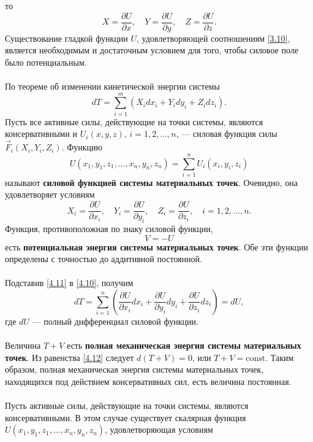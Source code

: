 \documentclass[a4paper, 12pt]{report}
\numberwithin{equation}{section}
\begin{document}
	то
	\begin{equation}
		\label{3.10}
		X = \frac{\partial U}{\partial x}, \quad Y = \frac{\partial U}{\partial y}, \quad Z = \frac{\partial U}{\partial z}. 
	\end{equation}
	Существование гладкой функции $U$, удовлетворяющей соотношениям \eqref{3.10}, является необходимым и достаточным условием для того, чтобы силовое поле было потенциальным. 
	\\\\
	По теореме об изменении кинетической энергии системы
	\begin{equation}
		\label{4.10}
		dT = \sum_{i=1}^{m}(X_i dx_i + Y_i dy_i + Z_idz_i).
	\end{equation}
	Пусть все активные силы, действующие на точки системы, являются консервативными и $U_i(x, y, z)$, $i = 1, 2, \ldots, n$, — силовая функция силы $\vec{F}_i(X_i, Y_i, Z_i)$. 
	Функцию
	\[
	U(x_1, y_1, z_1, \ldots, x_n, y_n, z_n) = \sum_{i=1}^{n} U_i(x_i, y_i, z_i)
	\]
	называют \textbf{силовой функцией системы материальных точек}. Очевидно, она удовлетворяет условиям
	\begin{equation}
		\label{4.11}
		X_i = \frac{\partial U}{\partial x_i}, \quad Y_i = \frac{\partial U}{\partial y_i}, \quad Z_i = \frac{\partial U}{\partial z_i}, \quad i = 1, 2, \ldots, n. 
	\end{equation}
	Функция, противоположная по знаку силовой функции,
	\[
	V = -U
	\]
	есть \textbf{потенциальная энергия системы материальных точек}. Обе эти функции определены с точностью до аддитивной постоянной.
	\\\\
	Подставив \eqref{4.11} в \eqref{4.10}, получим
	\begin{equation}
		\label{4.12}
		dT = \sum_{i=1}^{n} \left( \frac{\partial U}{\partial x_i} dx_i + \frac{\partial U}{\partial y_i} dy_i + \frac{\partial U}{\partial z_i} dz_i \right) = dU,
	\end{equation}
	где $dU$ — полный дифференциал силовой функции.
	\\\\
	Величина $T + V$ есть \textbf{полная механическая энергия системы материальных точек}. Из равенства \eqref{4.12} следует $d(T + V) = 0$, или $T + V = \text{const}$. Таким образом, полная механическая энергия системы материальных точек, находящихся под действием консервативных сил, есть величина постоянная.
	\\\\
	Пусть активные силы, действующие на точки системы, являются консервативными. В этом случае существует скалярная функция $U(x_1, y_1, z_1, \dots, x_n, y_n, z_n)$, удовлетворяющая условиям
\end{document}
